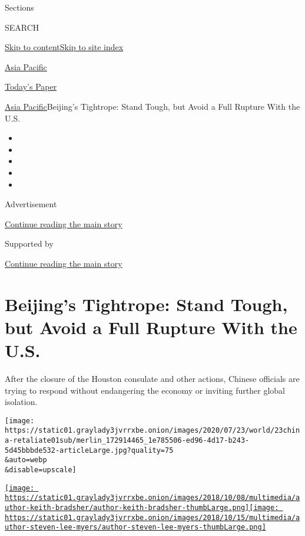 Sections

SEARCH

\protect\hyperlink{site-content}{Skip to
content}\protect\hyperlink{site-index}{Skip to site index}

\href{https://www.nytimes3xbfgragh.onion/section/world/asia}{Asia
Pacific}

\href{https://myaccount.nytimes3xbfgragh.onion/auth/login?response_type=cookie\&client_id=vi}{}

\href{https://www.nytimes3xbfgragh.onion/section/todayspaper}{Today's
Paper}

\href{/section/world/asia}{Asia Pacific}\textbar{}Beijing's Tightrope:
Stand Tough, but Avoid a Full Rupture With the U.S.

\begin{itemize}
\item
\item
\item
\item
\item
\end{itemize}

Advertisement

\protect\hyperlink{after-top}{Continue reading the main story}

Supported by

\protect\hyperlink{after-sponsor}{Continue reading the main story}

\hypertarget{beijings-tightrope-stand-tough-but-avoid-a-full-rupture-with-the-us}{%
\section{Beijing's Tightrope: Stand Tough, but Avoid a Full Rupture With
the
U.S.}\label{beijings-tightrope-stand-tough-but-avoid-a-full-rupture-with-the-us}}

After the closure of the Houston consulate and other actions, Chinese
officials are trying to respond without endangering the economy or
inviting further global isolation.

\texttt{[image: https://static01.graylady3jvrrxbe.onion/images/2020/07/23/world/23china-retaliate01sub/merlin\_172914465\_1e785506-ed96-4d17-b243-5d45bbbde532-articleLarge.jpg?quality=75\\\&auto=webp\\\&disable=upscale]}

\href{https://www.nytimes3xbfgragh.onion/by/keith-bradsher}{\texttt{[image: https://static01.graylady3jvrrxbe.onion/images/2018/10/08/multimedia/author-keith-bradsher/author-keith-bradsher-thumbLarge.png]}}\href{https://www.nytimes3xbfgragh.onion/by/steven-lee-myers}{\texttt{[image: https://static01.graylady3jvrrxbe.onion/images/2018/10/15/multimedia/author-steven-lee-myers/author-steven-lee-myers-thumbLarge.png]}}

